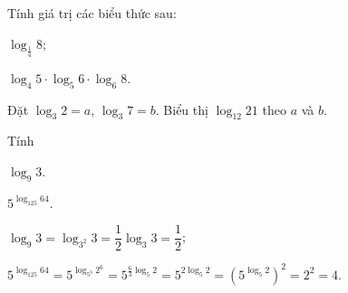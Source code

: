 \begin{vd}%
	Tính giá trị các biểu thức sau:
	\begin{listEX}[2]
		\item[a)] $ \log_{\frac{1}{4}} 8$;
		\item[b)] $ \log_4 5\cdot \log_5 6\cdot \log_6 8$.
	\end{listEX}
\end{vd}

\begin{vd}%
	Đặt $ \log_3 2=a $, $ \log_3 7=b $. Biểu thị $ \log_{12} 21 $ theo $ a $ và $ b $.
\end{vd}

\begin{vd} %
	Tính
	\begin{listEX}[2]
		\item  $\log _{9} 3$.
		\item $5^{\log _{125} 64}$.
	\end{listEX}
	\loigiai
	{\begin{listEX}[1]
			\item $ \log _{9} 3=\log _{3^{2}} 3=\dfrac{1}{2} \log _{3} 3=\dfrac{1}{2}$;
			\item $5^{\log _{125} 64}=5^{\log _{5^3} 2^6}=5^{\frac{6}{3}\log _{5} 2}=5^{2\log _{5} 2}=\left({5^{\log _{5} 2}}\right)^2=2^2=4$.
		\end{listEX}
	}
\end{vd}

